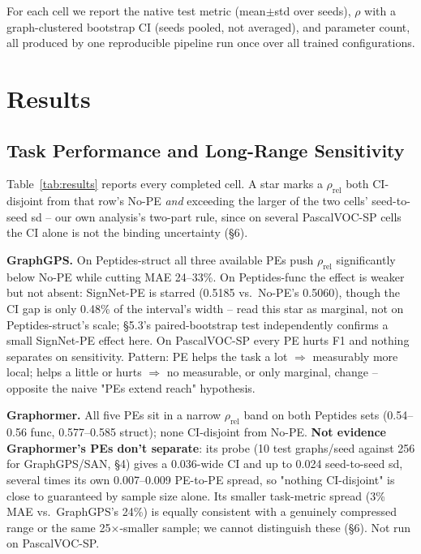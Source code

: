 \documentclass[10pt]{article}
\begin{document}
For each cell we report the native test metric (mean$\pm$std over seeds), $\rho$ with a graph-clustered bootstrap CI (seeds pooled, not averaged), and parameter count, all produced by one reproducible pipeline run once over all trained configurations.

\section{Results}
\subsection{Task Performance and Long-Range Sensitivity}
Table~\ref{tab:results} reports every completed cell. A star marks a $\rho_{\text{rel}}$ both CI-disjoint from that row's No-PE \emph{and} exceeding the larger of the two cells' seed-to-seed sd -- our own analysis's two-part rule, since on several PascalVOC-SP cells the CI alone is not the binding uncertainty (\S6).




\textbf{GraphGPS.} On Peptides-struct all three available PEs push $\rho_{\text{rel}}$ significantly below No-PE while cutting MAE 24--33\%. On Peptides-func the effect is weaker but not absent: SignNet-PE is starred (0.5185 vs.\ No-PE's 0.5060), though the CI gap is only 0.48\% of the interval's width -- read this star as marginal, not on Peptides-struct's scale; \S5.3's paired-bootstrap test independently confirms a small SignNet-PE effect here. On PascalVOC-SP every PE hurts F1 and nothing separates on sensitivity. Pattern: PE helps the task a lot $\Rightarrow$ measurably more local; helps a little or hurts $\Rightarrow$ no measurable, or only marginal, change -- opposite the naive "PEs extend reach" hypothesis.

\textbf{Graphormer.} All five PEs sit in a narrow $\rho_{\text{rel}}$ band on both Peptides sets (0.54--0.56 func, 0.577--0.585 struct); none CI-disjoint from No-PE. \textbf{Not evidence Graphormer's PEs don't separate}: its probe (10 test graphs/seed against 256 for GraphGPS/SAN, \S4) gives a 0.036-wide CI and up to 0.024 seed-to-seed sd, several times its own 0.007--0.009 PE-to-PE spread, so "nothing CI-disjoint" is close to guaranteed by sample size alone. Its smaller task-metric spread (3\% MAE vs.\ GraphGPS's 24\%) is equally consistent with a genuinely compressed range or the same 25$\times$-smaller sample; we cannot distinguish these (\S6). Not run on PascalVOC-SP.
\end{document}
